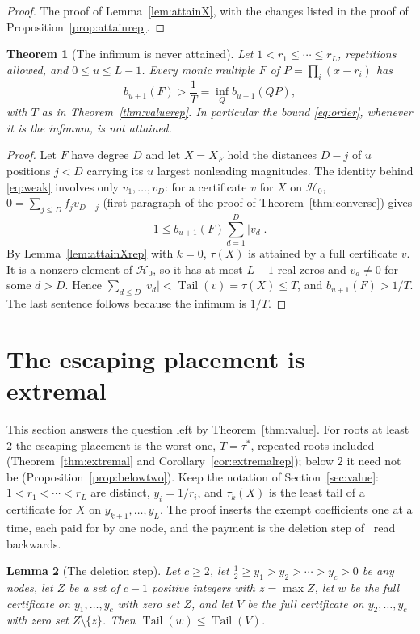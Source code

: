 \documentclass[11pt]{article}
\newtheorem{theorem}{Theorem}[section]
\newtheorem{lemma}[theorem]{Lemma}
\theoremstyle{definition}
\theoremstyle{plain}
\DeclareMathOperator{\Tail}{Tail}
\begin{document}
\begin{proof}
The proof of Lemma~\ref{lem:attainX}, with the changes listed in the proof
of Proposition~\ref{prop:attainrep}.
\end{proof}

\begin{theorem}[The infimum is never attained]\label{thm:noattain}
Let $1<r_1\le\cdots\le r_L$, repetitions allowed, and $0\le u\le L-1$.  Every
monic multiple $F$ of $P=\prod_i(x-r_i)$ has
\[
  b_{u+1}(F)>\frac1T=\inf_Qb_{u+1}(QP),
\]
with $T$ as in Theorem~\ref{thm:valuerep}.  In particular the
bound \eqref{eq:order}, whenever it is the infimum, is not attained.
\end{theorem}

\begin{proof}
Let $F$ have degree $D$ and let $X=X_F$ hold the distances $D-j$ of $u$
positions $j<D$ carrying its $u$ largest nonleading magnitudes.  The identity
behind \eqref{eq:weak} involves only $v_1,\ldots,v_D$: for a certificate $v$
for $X$ on $\mathcal H_0$, $0=\sum_{j\le D}f_jv_{D-j}$ (first paragraph of
the proof of Theorem~\ref{thm:converse}) gives
\[
  1\le b_{u+1}(F)\sum_{d=1}^{D}|v_d| .
\]
By Lemma~\ref{lem:attainXrep} with $k=0$, $\tau(X)$ is attained by a
full certificate $v$.  It is a nonzero element of $\mathcal H_0$, so it has
at most $L-1$ real zeros and $v_d\ne0$ for some $d>D$.  Hence
$\sum_{d\le D}|v_d|<\Tail(v)=\tau(X)\le T$, and $b_{u+1}(F)>1/T$.  The last
sentence follows because the infimum is $1/T$.
\end{proof}

\section{The escaping placement is extremal}\label{sec:extremal}

This section answers the question left by Theorem~\ref{thm:value}.  For roots
at least $2$ the escaping placement is the worst one, $T=\tau^*$, repeated
roots included (Theorem~\ref{thm:extremal} and
Corollary~\ref{cor:extremalrep}); below $2$ it need not be
(Proposition~\ref{prop:belowtwo}).  Keep the notation of
Section~\ref{sec:value}: $1<r_1<\cdots<r_L$ are distinct, $y_i=1/r_i$, and
$\tau_k(X)$ is the least tail of a certificate for $X$ on
$y_{k+1},\ldots,y_L$.  The
proof inserts the exempt coefficients one at a time, each paid for by one
node, and the payment is the deletion step of~\cite[Theorem~2.2]{coefficient-mass} read backwards.

\begin{lemma}[The deletion step]\label{lem:delete}
Let $c\ge2$, let $\tfrac12\ge y_1>y_2>\cdots>y_c>0$ be any nodes, let $Z$ be a set of $c-1$
positive integers with $z=\max Z$, let $w$ be the full certificate on
$y_1,\ldots,y_c$ with zero set $Z$, and let $V$ be the full certificate on
$y_2,\ldots,y_c$ with zero set $Z\setminus\{z\}$.  Then
$\Tail(w)\le\Tail(V)$.
\end{lemma}
\end{document}
